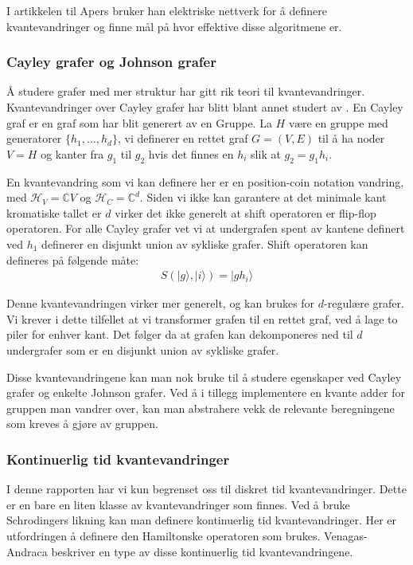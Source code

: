         I artikkelen til Apers \cite{apers2019unified} bruker han elektriske nettverk for å definere kvantevandringer og finne mål på hvor effektive disse algoritmene er.
    
    \subsubsection*{Cayley grafer og Johnson grafer}

        Å studere grafer med mer struktur har gitt rik teori til kvantevandringer. Kvantevandringer over Cayley grafer har blitt blant annet studert av \cite{dai2018discretetime}. En Cayley graf er en graf som har blit generert av en Gruppe. La $H$ være en gruppe med generatorer $\{h_1,...,h_d\}$, vi definerer en rettet graf $G=(V,E)$ til å ha noder $V=H$ og kanter fra $g_1$ til $g_2$ hvis det finnes en $h_i$ slik at $g_2 = g_1h_i$.
        
        En kvantevandring som vi kan definere her er en position-coin notation vandring, med $\mathcal{H}_V=\mathbb{C}V$ og $\mathcal{H}_C=\mathbb{C}^d$. Siden vi ikke kan garantere at det minimale kant kromatiske tallet er $d$ virker det ikke generelt at shift operatoren er flip-flop operatoren. For alle Cayley grafer vet vi at undergrafen spent av kantene definert ved $h_1$ definerer en disjunkt union av sykliske grafer. Shift operatoren kan defineres på følgende måte:
        \begin{align*}
            S(|g\rangle,|i\rangle) = |gh_i\rangle
        \end{align*}
        
        Denne kvantevandringen virker mer generelt, og kan brukes for $d$-regulære grafer. Vi krever i dette tilfellet at vi transformer grafen til en rettet graf, ved å lage to piler for enhver kant. Det følger da at grafen kan dekomponeres ned til $d$ undergrafer som er en disjunkt union av sykliske grafer.
        
        Disse kvantevandringene kan man nok bruke til å studere egenskaper ved Cayley grafer og enkelte Johnson grafer. Ved å i tillegg implementere en kvante adder for gruppen man vandrer over, kan man abstrahere vekk de relevante beregningene som kreves å gjøre av gruppen.
    
    \subsubsection*{Kontinuerlig tid kvantevandringer}
    
        I denne rapporten har vi kun begrenset oss til diskret tid kvantevandringer. Dette er en bare en liten klasse av kvantevandringer som finnes. Ved å bruke Schrodingers likning kan man definere kontinuerlig tid kvantevandringer. Her er utfordringen å definere den Hamiltonske operatoren som brukes. Venagas-Andraca \cite{Venegas_Andraca_2012} beskriver en type av disse kontinuerlig tid kvantevandringene.
        
